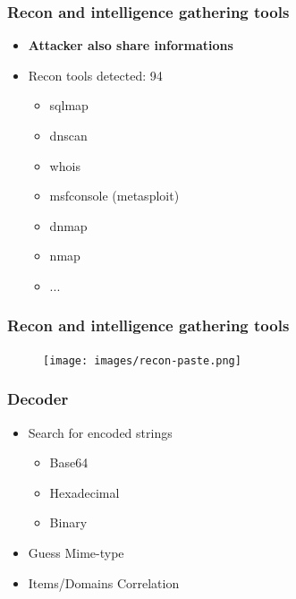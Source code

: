 \documentclass[aspectratio=169]{beamer}
\begin{document}
\begin{frame}
    \frametitle{Recon and intelligence gathering tools}
        \begin{itemize}
            \item {\bf Attacker also share informations}
            \item Recon tools detected: 94
            \begin{itemize}
            	\item sqlmap
            	\item dnscan
            	\item whois
            	\item msfconsole (metasploit)
            	\item dnmap
            	\item nmap
            	\item ...
            \end{itemize}
        \end{itemize}
\end{frame}


\begin{frame}
    \frametitle{Recon and intelligence gathering tools}
        \begin{figure}
            \texttt{[image: images/recon-paste.png]}
        \end{figure}
\end{frame}


\begin{frame}
    \frametitle{Decoder}
    \begin{itemize}
    	\item Search for encoded strings
    		\begin{itemize}
				\item Base64
				\item Hexadecimal
				\item Binary
			\end{itemize}
    	\item Guess Mime-type
    	\item Items/Domains Correlation
    \end{itemize}
\end{frame}

\end{document}

